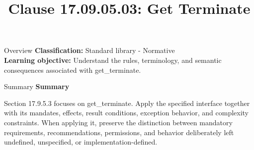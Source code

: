 \documentclass[10pt,letterpaper]{article}
\title{Clause 17.09.05.03: Get Terminate}
\author{}
\date{}
\begin{document}
\maketitle
\begin{CornellOverviewBox}{Overview}
\textbf{Classification:} Standard library - Normative\\[2pt]
\textbf{Learning objective:} Understand the rules, terminology, and semantic consequences associated with get\_terminate.
\end{CornellOverviewBox}\begin{CornellSummaryBox}{Summary}
{\sffamily\bfseries\color{Accent} Summary}\par\vspace{3pt}Section 17.9.5.3 focuses on get\_terminate. Apply the specified interface together with its mandates, effects, result conditions, exception behavior, and complexity constraints. When applying it, preserve the distinction between mandatory requirements, recommendations, permissions, and behavior deliberately left undefined, unspecified, or implementation-defined.
\end{CornellSummaryBox}
\end{document}
